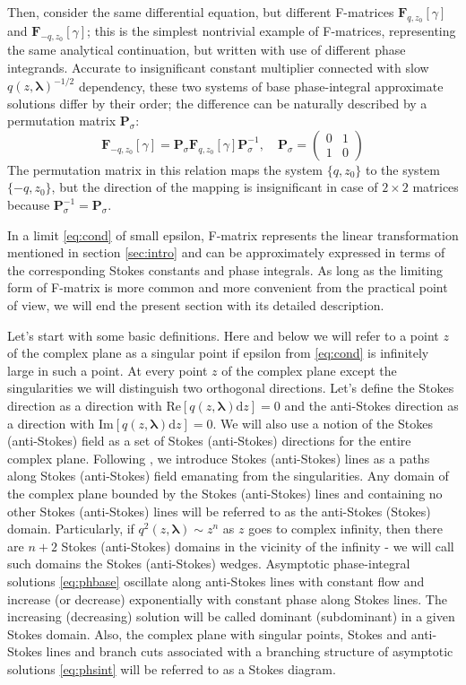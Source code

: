 \documentclass[atmp]{ipart_v1}
\def\rmd{\mathrm{d}}
\def\lmbd{\bm{\lambda}}
\def\F{\bm{F}}
\def\P{\bm{P}_\sigma}
\def\Re{\mathrm{Re}}
\def\Im{\mathrm{Im}}
\newcommand\eref[1]{\eqref{#1}}
\newcommand\sref[1]{section \ref{#1}}
\newcommand\phsintgrnd[1][z]{q(#1,\lmbd)}
\newcommand\predexp[1][z]{q(#1,\lmbd)^{-1/2}}
\begin{document}
Then, consider the same differential equation, but different F-matrices $\F_{q,z_0}[\gamma]$ and $\F_{-q,z_0}[\gamma]$;
this is the simplest nontrivial example of F-matrices, representing the same analytical continuation, but written
with use of different phase integrands. Accurate to insignificant constant multiplier connected with slow
$\predexp$ dependency, these two systems of base phase-integral approximate solutions differ by their order;
the difference can be naturally described by a permutation matrix $\P$:
\begin{equation}
\F_{-q,z_0}[\gamma] = \P\F_{q,z_0}[\gamma]\P^{-1}, \quad
\P =
\left(\begin{array}{*{2}{c}}
0 & 1 \\ 1 & 0 
\end{array}\right) 
\label{eq:qchange} 
\end{equation}
The permutation matrix in this relation maps the system $\{q,z_0\}$ to the system $\{-q,z_0\}$, but the direction
of the mapping is insignificant in case of $2 \times 2$ matrices because $\P^{-1} = \P$. 

In a limit \eref{eq:cond} of small epsilon, F-matrix represents the linear transformation
mentioned in \sref{sec:intro} and can be approximately expressed in terms of the corresponding
Stokes constants and phase integrals. As long as the limiting form of F-matrix is more common
and more convenient from the practical point of view, we will end the present section with 
its detailed description.

Let's start with some basic definitions. Here and below we will refer to a point $z$ of the complex
plane as a singular point if epsilon from \eref{eq:cond} is infinitely large in such a point. 
At every point $z$ of the complex plane except the singularities we will distinguish two 
orthogonal directions. Let's define the Stokes direction 
as a direction with $\Re \left[ \phsintgrnd \rmd z \right]=0$ and the anti-Stokes direction 
as a direction with $\Im \left[ \phsintgrnd \rmd z \right]=0$. We will also use a notion of 
the Stokes (anti-Stokes) field as a set of Stokes (anti-Stokes) directions for the entire 
complex plane. Following \cite{heading, rwbook}, we introduce Stokes (anti-Stokes) lines as a 
paths along Stokes (anti-Stokes) field emanating from the singularities. 
Any domain of the complex plane bounded by the Stokes (anti-Stokes) lines and containing no other 
Stokes (anti-Stokes) lines will be referred to as the anti-Stokes (Stokes) domain. Particularly, if 
$q^2(z,\lmbd) \sim z^n$ as $z$ goes to complex infinity, then there are $n+2$ Stokes 
(anti-Stokes) domains in the vicinity of the infinity - we will call such domains the Stokes 
(anti-Stokes) wedges. Asymptotic phase-integral solutions \eref{eq:phbase} oscillate along anti-Stokes 
lines with constant flow and increase (or decrease) exponentially with constant phase along Stokes lines. 
The increasing (decreasing) solution will be called dominant (subdominant) in a given Stokes domain. 
Also, the complex plane with singular points, Stokes and anti-Stokes lines and branch cuts associated 
with a branching structure of asymptotic solutions \eref{eq:phsint} will be referred to as a Stokes diagram.
\end{document}
